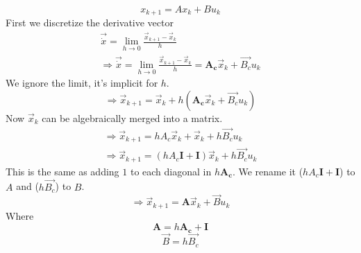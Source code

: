 \begin{equation}
	x_{k+1} = Ax_k + Bu_k
\end{equation}
First we discretize the derivative vector
\begin{subequations}
\begin{align}
\vec{\dot{x}} = \lim_{h\rightarrow 0} \frac{\vec{x}_{k+1}-\vec{x}_{k}}{h} \\
\Rightarrow \vec{\dot{x}} = \lim_{h\rightarrow 0} \frac{\vec{x}_{k+1}-\vec{x}_{k}}{h} = \mathbf{A_c} \vec{x}_k + \vec{B_c} u_k
\end{align}
\end{subequations}
We ignore the limit, it's implicit for $ h $.
\begin{equation}
\Rightarrow \vec{x}_{k+1} = \vec{x}_{k} + h(\mathbf{A_c} \vec{x}_k + \vec{B_c} u_k)
\end{equation}
Now $ \vec{x}_k $ can be algebraically merged into a matrix.
\begin{subequations}
\begin{align}
\Rightarrow \vec{x}_{k+1} = h{A_c} \vec{x}_k + \vec{x}_{k} + h\vec{B_c} u_k \\
\Rightarrow \vec{x}_{k+1} = (h{A_c} \mathbf{I} + \mathbf{I})\vec{x}_k + h\vec{B_c} u_k
\end{align}
\end{subequations}
This is the same as adding $ 1 $ to each diagonal in $ h\mathbf{A_c} $. We rename it ($hA_c\mathbf{I} + \mathbf{I}$) to $ {A}$ and ($h\vec{B_c}$) to $B$.
\begin{equation} \label{mat:eq}
\Rightarrow \vec{x}_{k+1} = \mathbf{A} \vec{x}_k + \vec{B} u_k
\end{equation}
Where
\begin{equation}
\mathbf{A} = h\mathbf{A_c} + \mathbf{I}
\end{equation}
\begin{equation}
\vec{B} = h\vec{B_c}
\end{equation}

